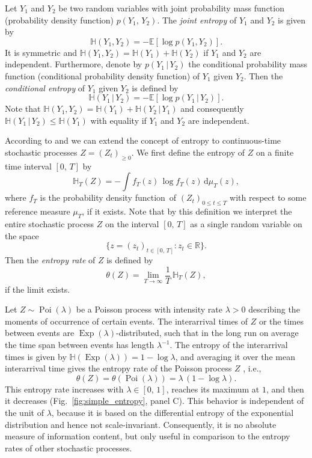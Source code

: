 \documentclass[smallextended]{svjour3}
\newcommand{\R}{\mathbb{R}}
\newcommand{\E}{\mathbb{E}}
\renewcommand{\H}{\mathbb{H}}
\newcommand{\Exp}{\operatorname{Exp}}
\newcommand{\Poi}{\operatorname{Poi}}
\newcommand{\liml}{\lim\limits}
\newcommand{\dd}[1]{\,\mathrm{d}#1}
\newcommand{\ie}{i.e.}
\newcommand{\pdf}{probability density function}
\begin{document}
Let $Y_1$ and $Y_2$ be two random variables with joint probability mass function (\pdf) $p(Y_1,\,Y_2)$.
The \emph{joint entropy} of $Y_1$ and $Y_2$ is given by
\begin{equation*}
  \H(Y_1,Y_2) = -\E\left[\log p(Y_1,Y_2)\right].
\end{equation*}
It is symmetric and $\H(Y_1,Y_2) = \H(Y_1) + \H(Y_2)$ if $Y_1$ and $Y_2$ are independent.
Furthermore, denote by $p(Y_1\,|\,Y_2)$ the conditional probability mass function (conditional \pdf) of $Y_1$ given $Y_2$.
Then the \emph{conditional entropy} of $Y_1$ given $Y_2$ is defined by
\begin{equation*}
	\H(Y_1\,|\,Y_2) = -\E\left[\log p(Y_1\,|\,Y_2)\right].
\end{equation*}
Note that $\H(Y_1, Y_2) = \H(Y_1) + \H(Y_2\,|\,Y_1)$ and consequently $\H(Y_1\,|\,Y_2) \leq \H(Y_1)$ with equality if $Y_1$ and $Y_2$ are independent.

According to \citet{Dumitrescu1988MICAS} and \citet{Girardin2003JAP} we can extend the concept of entropy to continuous-time stochastic processes $Z=(Z_t)_{\geq0}$.
We first define the entropy of $Z$ on a finite time interval $[0,\,T]$ by
\begin{equation*}
  \H_T(Z) = - \int f_T(z)\,\log f_T(z)\dd{\mu_T(z)},	 
\end{equation*}
where $f_T$ is the \pdf\ of $(Z_t)_{0\leq t\leq T}$ with respect to some reference measure $\mu_T$, if it exists.
Note that by this definition we interpret the entire stochastic process $Z$ on the interval $[0,\,T]$ as a single random variable on the space
\begin{equation*}
  \{z=(z_t)_{t\in[0,\,T]}: z_t\in\R\}.
\end{equation*}
Then the \emph{entropy rate} of $Z$ is defined by
\begin{equation*}
	\theta(Z) = \liml_{T\to\infty} \frac{1}{T}\,\H_T(Z),
\end{equation*}
if the limit exists.

Let $Z\sim\Poi(\lambda)$ be a Poisson process with intensity rate $\lambda>0$ describing the moments of occurrence of certain events.
The interarrival times of $Z$ or the times between events are $\Exp(\lambda)$-distributed, such that in the long run on average the time span between events has length $\lambda^{-1}$.
The entropy of the interarrival times is given by $\H(\Exp(\lambda))=1-\log \lambda$, and averaging it over the mean interarrival time gives the entropy rate of the Poisson process $Z$ \citep[Section 3.3]{Gaspard1993PR}, \ie,
\begin{equation*}
  \theta(Z) = \theta(\Poi(\lambda)) = \lambda\,(1-\log \lambda).
\end{equation*}
This entropy rate increases with $\lambda\in[0,\,1]$, reaches its maximum at $1$, and then it decreases (Fig.~\ref{fig:simple_entropy}, panel C).
This behavior is independent of the unit of $\lambda$, because it is based on the differential entropy of the exponential distribution and hence not scale-invariant.
Consequently, it is no absolute measure of information content, but only useful in comparison to the entropy rates of other stochastic processes.
\end{document}
